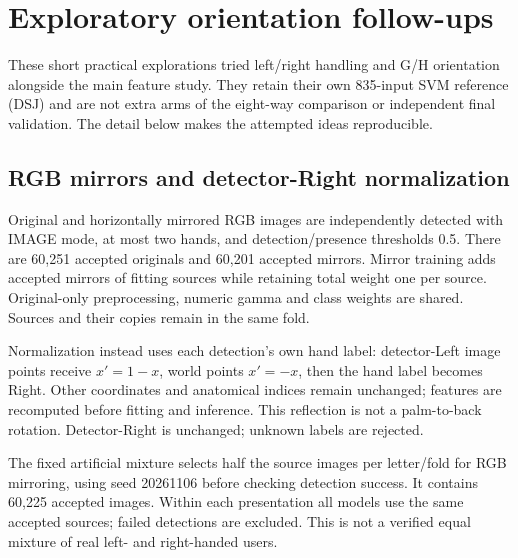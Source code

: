 \clearpage
\section{Exploratory orientation follow-ups}\label{app:ton-orientation}
These short practical explorations tried left/right handling and G/H orientation alongside the main feature study. They retain their own 835-input SVM reference (DSJ) and are not extra arms of the eight-way comparison or independent final validation. The detail below makes the attempted ideas reproducible.

\subsection{RGB mirrors and detector-Right normalization}
Original and horizontally mirrored RGB images are independently detected with IMAGE mode, at most two hands, and detection/presence thresholds 0.5. There are 60,251 accepted originals and 60,201 accepted mirrors. Mirror training adds accepted mirrors of fitting sources while retaining total weight one per source. Original-only preprocessing, numeric gamma and class weights are shared. Sources and their copies remain in the same fold.

Normalization instead uses each detection's own hand label: detector-Left image points receive $x'=1-x$, world points $x'=-x$, then the hand label becomes Right. Other coordinates and anatomical indices remain unchanged; features are recomputed before fitting and inference. This reflection is not a palm-to-back rotation. Detector-Right is unchanged; unknown labels are rejected.

The fixed artificial mixture selects half the source images per letter/fold for RGB mirroring, using seed 20261106 before checking detection success. It contains 60,225 accepted images. Within each presentation all models use the same accepted sources; failed detections are excluded. This is not a verified equal mixture of real left- and right-handed users.

